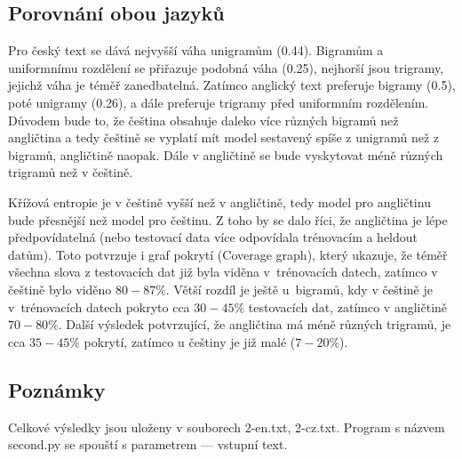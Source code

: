 \documentclass[12pt, a4paper]{report}
\theoremstyle{remark}
\begin{document}
\subsection*{Porovnání obou jazyků}
Pro český text se dává nejvyšší váha unigramům (0.44). Bigramům a uniformnímu rozdělení se přiřazuje podobná váha (0.25), nejhorší jsou trigramy, jejichž váha je téměř zanedbatelná. Zatímco anglický text preferuje bigramy (0.5), poté unigramy (0.26), a dále preferuje trigramy před uniformním rozdělením. Důvodem bude to, že čeština obsahuje daleko více různých bigramů než angličtina a tedy češtině se vyplatí mít model sestavený spíše z unigramů než z bigramů, angličtině naopak. Dále v angličtině se bude vyskytovat méně různých trigramů než v češtině.

Křížová entropie je v češtině vyšší než v angličtině, tedy model pro angličtinu bude přesnější než model pro češtinu. Z toho by se dalo říci, že angličtina je lépe předpovídatelná (nebo testovací data více odpovídala trénovacím a heldout datům). Toto potvrzuje i graf pokrytí (Coverage graph), který ukazuje, že téměř všechna slova z testovacích dat již byla viděna v~trénovacích datech, zatímco v češtině bylo viděno $80-87 \%$. Větší rozdíl je ještě u~bigramů, kdy v češtině je v~trénovacích datech pokryto cca $30-45 \%$ testovacích dat, zatímco v angličtině $70-80 \%$. Další výsledek potvrzující, že angličtina má méně různých trigramů, je cca $35-45\%$ pokrytí, zatímco u češtiny je již malé ($7-20\%$).

\subsection*{Poznámky}
Celkové výsledky jsou uloženy v souborech 2-en.txt, 2-cz.txt. Program s názvem second.py se spouští s parametrem --- vstupní text.
\end{document}
